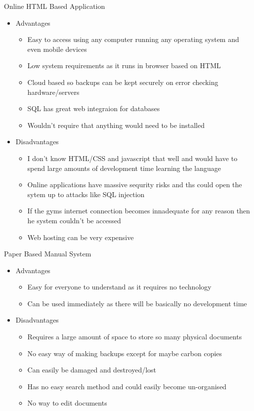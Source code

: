 Online HTML Based Application

\begin{itemize}
    \item Advantages
    \begin{itemize}
        \item Easy to access using any computer running any operating system and even mobile devices
        \item Low system requirements as it runs in browser based on HTML
        \item Cloud based so backups can be kept securely on error checking hardware/servers
        \item SQL has great web integraion for databases
        \item Wouldn't require that anything would need to be installed
    \end{itemize}
    \item Disadvantages
    \begin{itemize}
        \item I don't know HTML/CSS and javascript that well and would have to spend large amounts of development time learning the language
        \item Online applications have massive sequrity risks and ths could open the sytem up to attacks like SQL injection
        \item If the gyms internet connection becomes innadequate for any reason then he system couldn't be accessed
        \item Web hosting can be very expensive 
    \end{itemize}
\end{itemize}

Paper Based Manual System

\begin{itemize}
	\item Advantages
	\begin{itemize}
		\item Easy for everyone to understand as it requires no technology
		\item Can be used immediately as there will be basically no development time
	\end{itemize}
	\item Disadvantages
	\begin{itemize}
		\item Requires a large amount of space to store so many physical documents
		\item No easy way of making backups except for maybe carbon copies
		\item Can easily be damaged and destroyed/lost
		\item Has no easy search method and could easily become un-organised
		\item No way to edit documents
	\end{itemize}
\end{itemize}

